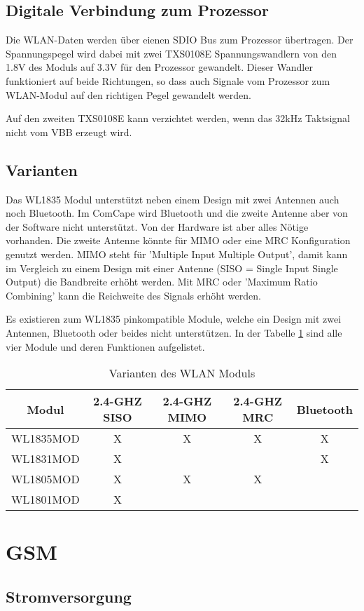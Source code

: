 
\subsection{Digitale Verbindung zum Prozessor}
Die WLAN-Daten werden über eienen SDIO Bus zum Prozessor übertragen. Der Spannungspegel wird dabei mit zwei TXS0108E Spannungswandlern von den 1.8V des Moduls auf 3.3V für den Prozessor gewandelt. Dieser Wandler funktioniert auf beide Richtungen, so dass auch Signale vom Prozessor zum WLAN-Modul auf den richtigen Pegel gewandelt werden.

Auf den zweiten TXS0108E kann verzichtet werden, wenn das 32kHz Taktsignal nicht vom VBB erzeugt wird.

\subsection{Varianten}\label{sec:wlan_varianten}
Das WL1835 Modul unterstützt neben einem Design mit zwei Antennen auch noch Bluetooth. Im ComCape wird Bluetooth und die zweite Antenne aber von der Software nicht unterstützt. Von der Hardware ist aber alles Nötige vorhanden. Die zweite Antenne könnte für MIMO oder eine MRC Konfiguration genutzt werden. MIMO steht für 'Multiple Input Multiple Output', damit kann im Vergleich zu einem Design mit einer Antenne (SISO = Single Input Single Output) die Bandbreite erhöht werden. Mit MRC oder 'Maximum Ratio Combining' kann die Reichweite des Signals erhöht werden.

Es existieren zum WL1835 pinkompatible Module, welche ein Design mit zwei Antennen, Bluetooth oder beides nicht unterstützen. In der Tabelle \ref{tab:wlanVarianten} sind alle vier Module und deren Funktionen aufgelistet.

\begin{table}

    \begin{tabular}{ | c | c | c | c | c |}
    \hline
    \textbf{Modul}		& \textbf{2.4-GHZ SISO}	& \textbf{2.4-GHZ MIMO}	& \textbf{2.4-GHZ MRC}	& \textbf{Bluetooth} \\ \hline
    
     WL1835MOD	& X				& X	 			& X				& X \\ \hline    
    
     WL1831MOD	& X				&	 			& 				& X \\ \hline  
    
     WL1805MOD	& X				& X	 			& X				&  \\ \hline  
    
     WL1801MOD	& X				& 	 			& 				&  \\ \hline  
    
    
    \end{tabular}
\caption{Varianten des WLAN Moduls}
\label{tab:wlanVarianten}
\end{table}




\section{GSM}


\subsection{Stromversorgung}
